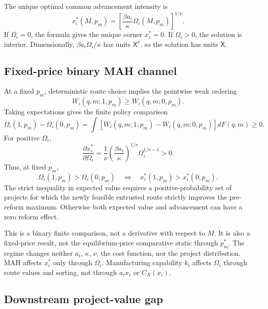 The unique optimal common advancement intensity is
\begin{equation}
  x_i^*(M,p_m)
  =
  \left[
    \frac{\beta a_i}{\kappa}
    \Omega_i(M,p_m)
  \right]^{1/\nu}.
  \label{eq:p05-optimal-advancement}
\end{equation}
If \(\Omega_i=0\), the formula gives the unique corner \(x_i^*=0\).
If \(\Omega_i>0\), the solution is interior. Dimensionally,
\(\beta a_i\Omega_i/\kappa\) has units \(\mathsf X^\nu\), so the
solution has units \(\mathsf X\).

\subsection{Fixed-price binary MAH channel}
\label{subsec:p05-binary-channel}

At a fixed \(p_m\), deterministic route choice implies the pointwise weak ordering
\[
  W_i(q,m;1,p_m)\geq W_i(q,m;0,p_m).
\]
Taking expectations gives the finite policy comparison
\begin{equation}
  \Omega_i(1,p_m)-\Omega_i(0,p_m)
  =
  \int
  \left[
    W_i(q,m;1,p_m)-W_i(q,m;0,p_m)
  \right]dF(q,m)
  \geq0.
  \label{eq:p05-binary-channel}
\end{equation}
For positive \(\Omega_i\),
\[
  \frac{\partial x_i^*}{\partial\Omega_i}
  =
  \frac{1}{\nu}
  \left(\frac{\beta a_i}{\kappa}\right)^{1/\nu}
  \Omega_i^{1/\nu-1}
  >0.
\]
Thus, at fixed \(p_m\),
\[
  \Omega_i(1,p_m)>\Omega_i(0,p_m)
  \quad\Longleftrightarrow\quad
  x_i^*(1,p_m)>x_i^*(0,p_m).
\]
The strict inequality in expected value requires a positive-probability set
of projects for which the newly feasible entrusted route strictly improves
the pre-reform maximum. Otherwise both expected value and advancement can
have a zero reform effect.

This is a binary finite comparison, not a derivative with respect to \(M\).
It is also a fixed-price result, not the equilibrium-price comparative static
through \(p_m^*\). The regime changes neither \(a_i\), \(\kappa\), \(\nu\),
the cost function, nor the project distribution. MAH affects
\(x_i^*\) only through \(\Omega_i\). Manufacturing capability \(k_i\) affects
\(\Omega_i\) through route values and sorting, not through
\(a_ix_i\) or \(C_X(x_i)\).

\subsection{Downstream project-value gap}
\label{subsec:p05-value-gap}

